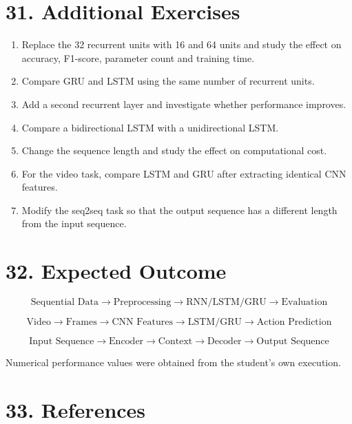 \documentclass[10pt]{article}
\begin{document}
\section*{31. Additional Exercises}

\begin{enumerate}
\item Replace the 32 recurrent units with 16 and 64 units and study the effect
on accuracy, F1-score, parameter count and training time.
\item Compare GRU and LSTM using the same number of recurrent units.
\item Add a second recurrent layer and investigate whether performance improves.
\item Compare a bidirectional LSTM with a unidirectional LSTM.
\item Change the sequence length and study the effect on computational cost.
\item For the video task, compare LSTM and GRU after extracting identical CNN
features.
\item Modify the seq2seq task so that the output sequence has a different
length from the input sequence.
\end{enumerate}

\section*{32. Expected Outcome}

\[
\boxed{
\text{Sequential Data}
\rightarrow\text{Preprocessing}
\rightarrow\text{RNN/LSTM/GRU}
\rightarrow\text{Evaluation}
}
\]

\[
\boxed{
\text{Video}
\rightarrow\text{Frames}
\rightarrow\text{CNN Features}
\rightarrow\text{LSTM/GRU}
\rightarrow\text{Action Prediction}
}
\]

\[
\boxed{
\text{Input Sequence}
\rightarrow\text{Encoder}
\rightarrow\text{Context}
\rightarrow\text{Decoder}
\rightarrow\text{Output Sequence}
}
\]

Numerical performance values were obtained from the student's own execution.

\section*{33. References}
\end{document}
